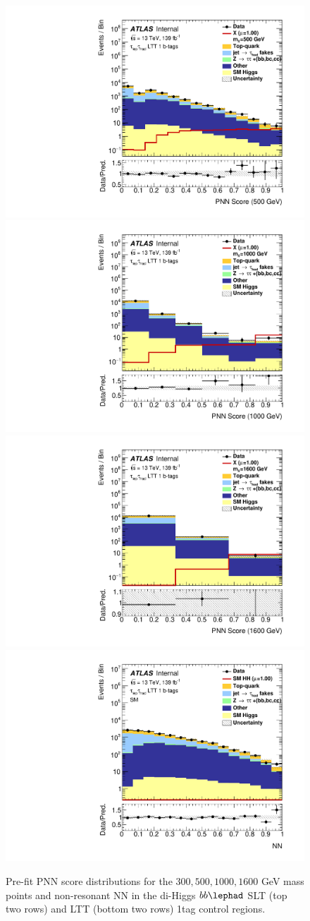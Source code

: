 \begin{figure}
\includegraphics[width=.32\textwidth]{figures/mva/HH/LepHad/LTT/Region_BMin0_incJet1_dist500_J2_D2HDMPNN_T1_SpcTauLH_Y2015_LTT1_L1_Prefitlog.pdf}
\includegraphics[width=.32\textwidth]{figures/mva/HH/LepHad/LTT/Region_BMin0_incJet1_dist1000_J2_D2HDMPNN_T1_SpcTauLH_Y2015_LTT1_L1_Prefitlog.pdf} \\
\includegraphics[width=.32\textwidth]{figures/mva/HH/LepHad/LTT/Region_BMin0_incJet1_dist1600_J2_D2HDMPNN_T1_SpcTauLH_Y2015_LTT1_L1_Prefitlog.pdf}
\includegraphics[width=.32\textwidth]{figures/mva/HH/LepHad/LTT/Region_BMin0_incJet1_distNN_J2_DSM_T1_SpcTauLH_Y2015_LTT1_L1_Prefitlog.pdf}
\caption{Pre-fit PNN score distributions for the $300, 500, 1000, 1600$ GeV mass points and non-resonant NN in the di-Higgs $bb\lephad$ SLT (top two rows) and LTT (bottom two rows) 1tag control regions.}
\label{fig:lephadmvaCRoutput}
\end{figure}
 
